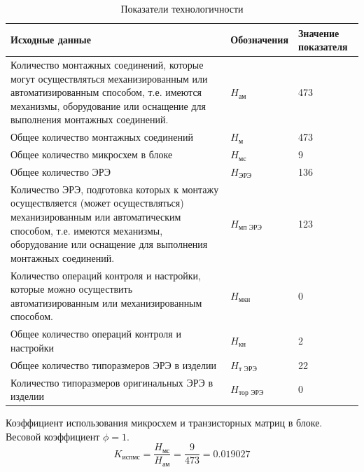 \begin{table}
    \centering
    \begin{tabu}{|X[l,m]|X[-1,c,m]|X[-1,c,m]|} \hline
        Исходные данные & Обозначения & Значение \newline показателя \\ \hline
        Количество монтажных соединений, которые могут осуществляться
        механизированным или автоматизированным способом,
        т.е. имеются механизмы, оборудование или оснащение для
        выполнения монтажных соединений.
        & $H_{\text{ам}}$ & 473  \\ \hline
        Общее количество монтажных соединений
        & $H_{\text{м}}$ & 473  \\ \hline
        Общее количество микросхем в блоке & $H_{\text{мс}}$ & 9  \\ \hline
        Общее количество ЭРЭ & $H_{\text{ЭРЭ}}$ & 136  \\ \hline
        Количество ЭРЭ, подготовка которых к монтажу осуществляется (может
        осуществляться) механизированным или автоматическим способом,
        т.е. имеются механизмы, оборудование или оснащение для выполнения
        монтажных соединений.
        & $H_{\text{мп ЭРЭ}}$ & 123  \\ \hline
        Количество операций контроля и настройки, которые можно осуществить
        автоматизированным или механизированным способом.
        & $H_{\text{мкн}}$ & 0  \\ \hline
        Общее количество операций контроля и настройки
        & $H_{\text{кн}}$ & 2  \\ \hline
        Общее количество типоразмеров ЭРЭ в изделии
        & $H_{\text{т ЭРЭ}}$ & 22  \\ \hline
        Количество типоразмеров оригинальных ЭРЭ в изделии
        & $H_{\text{тор ЭРЭ}}$ & 0  \\ \hline
    \end{tabu}
    \caption{Показатели технологичности}
    \label{technological_estaime_parametres}
\end{table}

Коэффициент использования микросхем и транзисторных матриц в блоке.
Весовой коэффициент $\phi = 1$.
$$
K_{\text{испмс}}
    = \frac{H_\text{мс}}
           {H_\text{ам}}
    = \frac{9}{473}
    = 0.019027
$$

